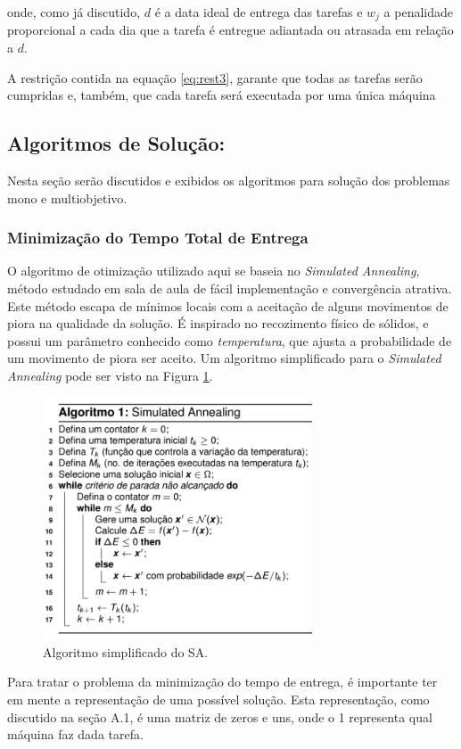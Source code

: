 \documentclass[conference]{IEEEtran}
\begin{document}
onde, como já discutido, $d$ é a data ideal de entrega das tarefas e $w_j$ a penalidade proporcional a cada dia que a tarefa é entregue adiantada ou atrasada em relação a $d$.

A restrição contida na equação \ref{eq:rest3}, garante que todas as tarefas serão cumpridas e, também, que cada tarefa será executada por uma única máquina

\subsection{Algoritmos de Solução:}
Nesta seção serão discutidos e exibidos os algoritmos para solução dos problemas mono e multiobjetivo.
\subsubsection{Minimização do Tempo Total de Entrega}
O algoritmo de otimização utilizado aqui se baseia no \textit{Simulated Annealing}, método estudado em sala de aula de fácil implementação e convergência atrativa. Este método escapa de mínimos locais com a aceitação de alguns movimentos de piora na qualidade da solução. É inspirado no recozimento físico de sólidos, e possui um parâmetro conhecido como \textit{temperatura}, que ajusta a probabilidade de um movimento de piora ser aceito. Um algoritmo simplificado para o \textit{Simulated Annealing} pode ser visto na Figura \ref{fig:algoritmo}.

	\begin{figure}[h]
		\includegraphics[width=8cm]{img/sa.png}
		\caption{Algoritmo simplificado do SA.}
		\label{fig:algoritmo}
	\end{figure}
	
Para tratar o problema da minimização do tempo de entrega, é importante ter em mente a representação de uma possível solução. Esta representação, como discutido na seção A.1, é uma matriz de zeros e uns, onde o 1 representa qual máquina faz dada tarefa.
\end{document}
